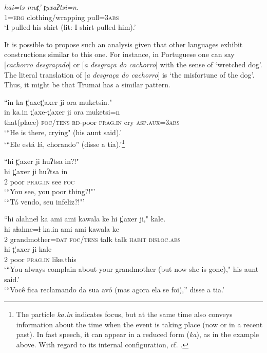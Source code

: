 \documentclass[output=paper,
modfonts,nonflat
]{langsci/langscibook}
\begin{document}
{\ex\label{exfn:trumai:3b}
\textit{hai=ts  mut̪'   t̪uxaʔtsi=n.}\\
1=\textsc{erg}  clothing/wrapping  pull=\textsc{3abs}\\
\glt `I pulled his shirt (lit: I shirt-pulled him).'\\
\z
\z



It is possible to propose such an analysis given that other languages exhibit constructions similar to this one. For instance, in Portuguese one can say [\textit{cachorro desgraçado}] or [\textit{a desgraça do cachorro}] with the sense of `wretched dog'. The literal translation of [\textit{a desgraça do cachorro}] is `the misfortune of the dog'. Thus, it might be that Trumai has a similar pattern.}  

\newpage 
\ea “in ka t̪'axet̪'axer ji ora muketsin."\\[.1em]
\gll in  ka.in t̪'axe-t̪'axer ji ora muketsi=n\\
that(place)  \textsc{foc/tens}  \textsc{rd}-poor \textsc{prag.in} cry \textsc{asp.aux}=\textsc{3abs} \\
\glt  ‘“He is there, crying" (his aunt said).'\\
‘“Ele está lá, chorando” (disse a tia).'\footnote{The particle \textit{ka.in} indicates focus, but at the same time also conveys information about the time when the event is taking place (now or in a recent past). In fast speech, it can appear in a reduced form (\textit{ka}), as in the example above. With regard to its internal configuration, cf. \citealt[169--178]{Guirardello1999}.}
\z

  

\ea “hi t̪'axer ji huʔtsa in?!"\\[.3em]
\gll hi  t̪'axer  ji  huʔtsa  in\\
2   poor \textsc{prag.in}  see   \textsc{foc}\\
\glt ‘“You see, you poor thing?!"'\\
‘“Tá vendo, seu infeliz?!"'
\z

\ea “hi aɬahneɬ ka ami ami kawala ke hi t̪'axer ji," kale.\\[.3em]
\gll  hi  aɬahne=ɬ     ka.in   ami  ami  kawala   ke\\
2  grandmother=\textsc{dat}  \textsc{foc/tens} talk  talk \textsc{habit}  \textsc{disloc.abs}\\



\gll  hi    t̪'axer ji         kale\\
2 poor  \textsc{prag.in} like.this\\
\glt ‘“You always complain about your grandmother (but now she is gone)," his aunt said.'\\
‘“Você fica reclamando da sua avó (mas agora ela se foi),” disse a tia.'
\z
\end{document}
